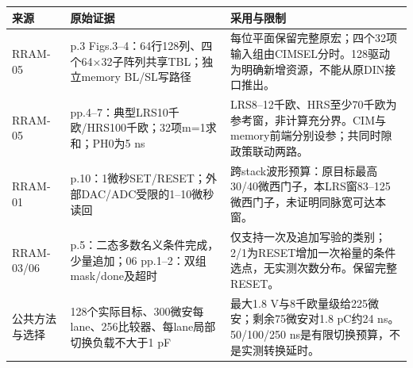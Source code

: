\begingroup\footnotesize\begin{longtable}{@{}>{\raggedright\arraybackslash}p{22mm}>{\raggedright\arraybackslash}p{59mm}>{\raggedright\arraybackslash}p{70mm}@{}}\toprule 来源 & 原始证据 & 采用与限制\\\midrule\endhead
RRAM-05 & p.3 Figs.3--4：64行128列、四个64×32子阵列共享TBL；独立memory BL/SL写路径 & 每位平面保留完整原宏；四个32项输入组由CIMSEL分时。128驱动为明确新增资源，不能从原DIN接口推出。\\
RRAM-05 & pp.4--7：典型LRS10千欧/HRS100千欧；32项m=1求和；PH0为5 ns & LRS8--12千欧、HRS至少70千欧为参考窗，非计算充分界。CIM与memory前端分别设参；共同时隙政策联动两路。\\
RRAM-01 & p.10：1微秒SET/RESET；外部DAC/ADC受限的1--10微秒读回 & 跨stack波形预算：原目标最高30/40微西门子，本LRS窗83--125微西门子，未证明同脉宽可达本窗。\\
RRAM-03/06 & 03 p.5：二态多数名义条件完成，少量追加；06 pp.1--2：双组mask/done及超时 & 仅支持一次及追加写验的类别；2/1为RESET增加一次裕量的条件选点，无实测次数分布。保留完整RESET。\\
公共方法与选择 & 128个实际目标、300微安每lane、256比较器、每lane局部切换负载不大于1 pF & 最大1.8 V与8千欧量级给225微安；剩余75微安对1.8 pC约24 ns。50/100/250 ns是有限切换预算，不是实测转换延时。\\
\bottomrule\end{longtable}\endgroup
